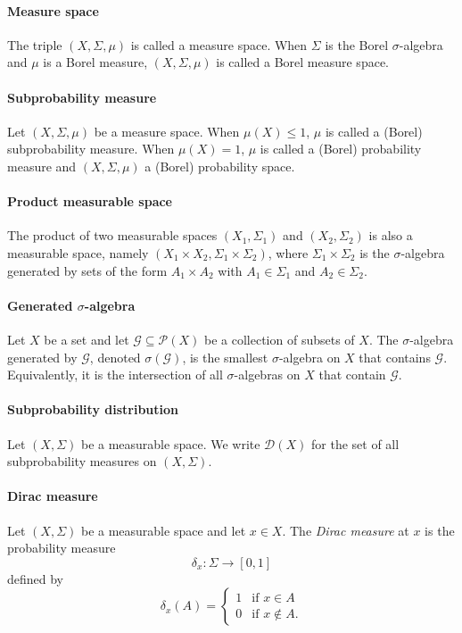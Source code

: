 \paragraph{Measure space} The triple $(X, \Sigma, \mu)$ is called a measure space.
 When $\Sigma$ is the Borel $\sigma$-algebra and $\mu$ is a Borel measure, $(X, \Sigma, \mu)$ is called a Borel measure space.

\paragraph{Subprobability measure} Let $(X, \Sigma, \mu)$ be a measure space. When $\mu(X) \leq 1$, $\mu$ is called a (Borel) subprobability measure. When $\mu(X) = 1$, $\mu$ is called a (Borel) probability measure and $(X, \Sigma, \mu)$ a (Borel) probability space.

\paragraph{Product measurable space} The product of two measurable spaces $(X_1, \Sigma_1)$ and $(X_2, \Sigma_2)$ is also a measurable space, namely $(X_1 \times X_2, \Sigma_1 \times \Sigma_2)$, where $\Sigma_1 \times \Sigma_2$ is the $\sigma$-algebra generated by sets of the form $A_1 \times A_2$ with $A_1 \in \Sigma_1$ and $A_2 \in \Sigma_2$.

\paragraph{Generated $\sigma$-algebra}
Let $X$ be a set and let $\mathcal{G} \subseteq \mathcal{P}(X)$ be a collection of subsets of $X$. The $\sigma$-algebra generated by $\mathcal{G}$, denoted $\sigma(\mathcal{G})$, is the smallest $\sigma$-algebra on $X$ that contains $\mathcal{G}$. Equivalently, it is the intersection of all $\sigma$-algebras on $X$ that contain $\mathcal{G}$.

\paragraph{Subprobability distribution} Let $(X,\Sigma)$ be a measurable space. We write $\mathcal{D}(X)$ for the set of all subprobability measures on $(X,\Sigma)$.

\paragraph{Dirac measure} 
Let $(X,\Sigma)$ be a measurable space and let $x \in X$. The
	\emph{Dirac measure} at $x$ is the probability measure
	\[
		\delta_x : \Sigma \to [0,1]
	\]
	defined by
	\[
		\delta_x(A) =
		\begin{cases}
		1 & \text{if } x \in A \\
		0 & \text{if } x \notin A.
		\end{cases}
	\]


